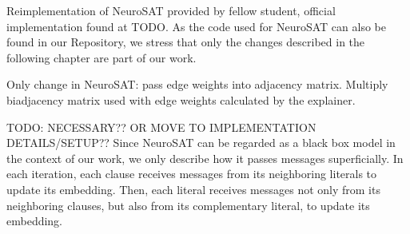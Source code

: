 Reimplementation of NeuroSAT provided by fellow student, official implementation found at TODO. As the code used for NeuroSAT can also be found in our Repository, we stress that only the changes described in the following chapter are part of our work. 


Only change in NeuroSAT: pass edge weights into adjacency matrix. Multiply biadjacency matrix used with edge weights calculated by the explainer.

TODO: NECESSARY?? OR MOVE TO IMPLEMENTATION DETAILS/SETUP??
Since NeuroSAT can be regarded as a black box model in the context of our work, we only describe how it passes messages superficially. In each iteration, each clause receives messages from its neighboring literals to update its embedding. Then, each literal receives messages not only from its neighboring clauses, but also from its complementary literal, to update its embedding.